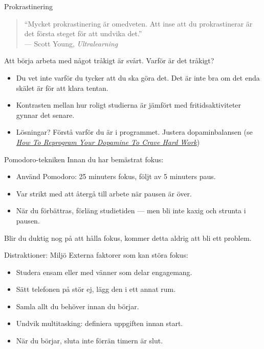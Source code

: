 \documentclass[presentation]{beamer}
\begin{document}
\begin{frame}{Prokrastinering}
\begin{quote}
“Mycket prokrastinering är omedveten. Att inse att du prokrastinerar är det första steget för att undvika det.”\\
— Scott Young, \textit{Ultralearning}
\end{quote}

Att börja arbeta med något tråkigt är svårt. Varför är det tråkigt?
\begin{itemize}
    \item Du vet inte varför du tycker att du ska göra det. Det är inte bra om det enda skälet är för att klara tentan.
    \item Kontrasten mellan hur roligt studierna är jämfört med fritidsaktiviteter gynnar det senare.
    \item Lösningar? Förstå varför du är i programmet. Justera dopaminbalansen (se \href{https://www.youtube.com/watch?v=8GUNhGRlQDU}{\textit{How To Reprogram Your Dopamine To Crave Hard Work}})
\end{itemize}
\end{frame}

\begin{frame}{Pomodoro-tekniken}
Innan du har bemästrat fokus:
\begin{itemize}
    \item Använd Pomodoro: 25 minuters fokus, följt av 5 minuters paus.
    \item Var strikt med att återgå till arbete när pausen är över.
    \item När du förbättras, förläng studietiden --- men bli inte kaxig och strunta i pausen.
\end{itemize}
Blir du duktig nog på att hålla fokus, kommer detta aldrig att bli ett problem.
\end{frame}

\begin{frame}{Distraktioner: Miljö}
Externa faktorer som kan störa fokus:
\begin{itemize}
    \item Studera ensam eller med vänner som delar engagemang.
    \item Sätt telefonen på stör ej, lägg den i ett annat rum.
    \item Samla allt du behöver innan du börjar.
    \item Undvik multitasking: definiera uppgiften innan start.
    \item När du börjar, sluta inte förrän timern är slut.
\end{itemize}
\end{frame}
\end{document}
